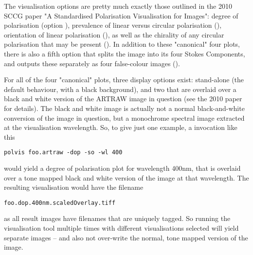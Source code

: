 The visualisation options are pretty much exactly those outlined in the 2010 SCCG paper "A Standardised Polarisation Visualisation for Images": degree of polarisation (option ), prevalence of linear versus circular polarisation (), orientation of linear polarisation (), as well as the chirality of any circular polarisation that may be present (). In addition to these "canonical" four plots, there is also a fifth option that splits the image into its four Stokes Components, and outputs these separately as four false-colour images ().

For all of the four "canonical" plots, three display options exist: stand-alone (the default behaviour, with a black background), and two that are overlaid over a black and white version of the ARTRAW image in question (see the 2010 paper for details). The black and white image is actually not a normal black-and-white conversion of the image in question, but a monochrome spectral image extracted at the visualisation wavelength. So, to give just one example, a  invocation like this

\begin{verbatim}
polvis foo.artraw -dop -so -wl 400
\end{verbatim}

would yield a degree of polarisation plot for wavelength 400nm, that is overlaid over a tone mapped black and white version of the image at that wavelength. The resulting visualisation would have the filename

\begin{verbatim}
foo.dop.400nm.scaledOverlay.tiff
\end{verbatim}

as all  result images have filenames that are uniquely tagged. So running the visualisation tool multiple times with different visualisations selected will yield separate images -- and also not over-write the normal, tone mapped version of the image.


